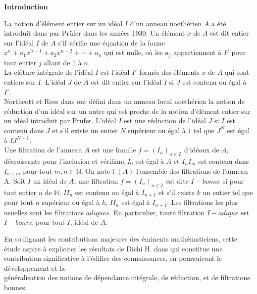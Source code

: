 \newpage
\tableofcontents
\renewcommand{\contentsname}{Table des matières}
\thispagestyle{empty}

\newpage

\setcounter{page}{0} 
\thispagestyle{empty}
\begin{center}
	\LARGE{\textbf{Introduction}}
\end{center}
\vspace{1cm}

La notion d'élément entier sur un idéal $I$ d'un anneau noethérien $A$ a été introduit dans \cite{Pr} par Prüfer dans les années 1930. Un élément $x$ de $A $ est dit entier sur l'idéal $I$ de $A$ s'il vérifie une équation de la forme $x^n + a_1 x^{n-1} +a_2 x^{n-2}+ \cdots + a_n $ qui est nulle, où les $a_j$ appartiennent à $I^j$ pour tout entier $j$ allant de 1 à $n$.\\ 
La clôture intégrale de l'idéal $I$ est l'idéal $I'$ formés des éléments $x$ de $A$ qui sont entiers sur $I$. L'idéal $J$ de $A$ est dit entier sur l'idéal $I$ si $J$ est contenu ou égal à $I'$.\\ Northcott et Rees dans \cite{No} ont défini dans un anneau local noethérien la notion de réduction d'un idéal sur un autre qui est proche de la notion d'élément entier sur un idéal introduit par Prüfer. L'idéal $I$ est une réduction de l'idéal $J$ si $I$ est contenu dans $J$ et s'il existe un entier $N$ supérieur ou égal à $1$ tel que $J^N$ est égal à $IJ^{N-1}$.\\
Une filtration de l'anneau $A$ est une famille $f=(I_n)_{n \in \mathbb{Z}}$ d'idéaux de $A$, décroissante pour l'inclusion et vérifiant $I_0$ est égal à $A$ et $I_n I_m$ est contenu dans $I_{n+m}$ pour tout $m, n \in \mathbb{N}$. On note $\mathbb{F}(A)$ l'ensemble des filtrations de l'anneau A. Soit $I$ un idéal de $A$, une filtration $f=(I_n)_{n \in \mathbb{Z}}$ est dite $I-bonne$ si pour tout entier $n$ de $\mathbb{N}$, $II_n$ est contenu ou égal à $ I_{n+1}$ et s'il existe $k$ un entier tel que pour tout $n$ supérieur ou égal à $k$, $II_n$ est égal à $I_{n+1}$. Les filtrations les plus usuelles sont les filtrations $adiques$. En particulier, toute filtration $I-adique$ est $I-bonne$ pour tout $I$, idéal de $A$.

En soulignant les contributions majeures des éminents mathématiciens, cette étude aspire à expliciter les résultats de Dichi H. dans \cite{Di2} qui constitue une contribution significative à l'édifice des connaissances, en poursuivant le développement et la \\ généralisation des notions de dépendance intégrale, de réduction, et de filtrations bonnes.


